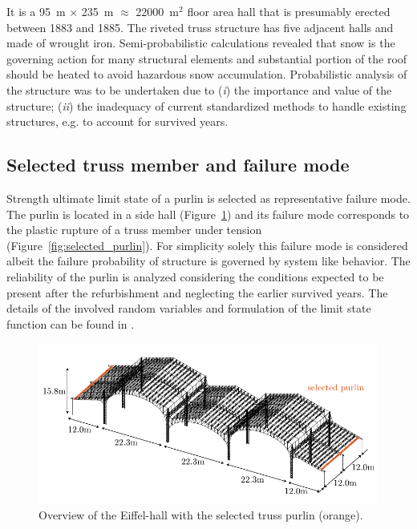 It is a 95~m $\times$ 235~m $\approx$ 22000~m$^2$ floor area hall that is presumably erected between 1883 and 1885. The riveted truss structure has five adjacent halls and made of wrought iron. Semi-probabilistic calculations revealed that snow is the governing action for many structural elements and substantial portion of the roof should be heated to avoid hazardous snow accumulation. Probabilistic analysis of the structure was to be undertaken due to (\textit{i}) the importance and value of the structure; (\textit{ii}) the inadequacy of current standardized methods to handle existing structures, e.g. to account for survived years.

\subsection{Selected truss member and failure mode}

Strength ultimate limit state of a purlin is selected as representative failure mode. The purlin is located in a side hall (Figure~\ref{fig:eiffel_hall_overview}) and its failure mode corresponds to the plastic rupture of a truss member under tension (Figure~\ref{fig:selected_purlin}). For simplicity solely this failure mode is considered albeit the failure probability of structure is governed by system like behavior. The reliability of the purlin is analyzed considering the conditions expected to be present after the refurbishment and neglecting the earlier survived years. The details of the involved random variables and formulation of the limit state function can be found in \cite{Eiffel2016}. 

\begin{figure}[htbp!] 
	\centering    
	\includegraphics[]{eiffel_hall_overview2_db.pdf}
	\caption{Overview of the Eiffel-hall with the selected truss purlin (orange).}
	\label{fig:eiffel_hall_overview}
\end{figure}


